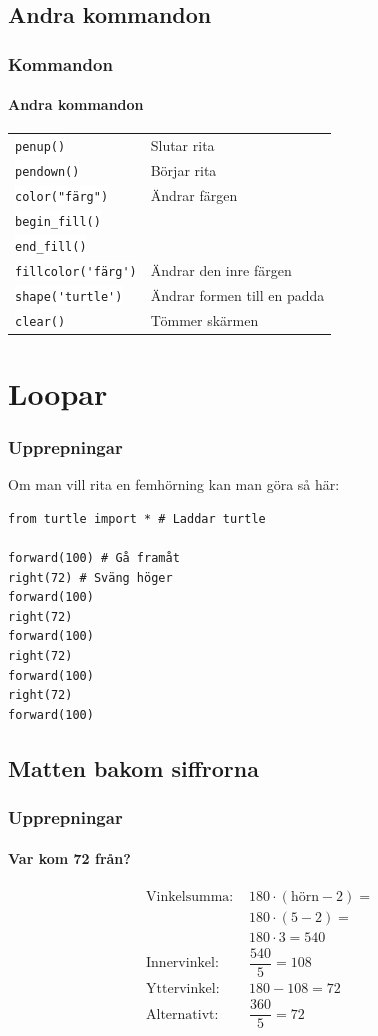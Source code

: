 \documentclass[aspectratio=169]{beamer}
\newcommand{\code}[1]{\colorbox{white}{\lstinline{#1}}}
\begin{document}
\subsection{Andra kommandon}

\begin{frame}
	\frametitle{Kommandon}
	\framesubtitle{Andra kommandon}
	
	\begin{tabular}{ll}
		\code{penup()} & Slutar rita\\
		\code{pendown()} & Börjar rita\\
		\code{color("färg")} & Ändrar färgen\\
		\code{begin_fill()} & \\
		\code{end_fill()} & \\
		\code{fillcolor('färg')} & Ändrar den inre färgen\\
		\code{shape('turtle')} & Ändrar formen till en padda\\
		\code{clear()} & Tömmer skärmen
	\end{tabular}
	
\end{frame}

\section{Loopar}

\begin{frame}[fragile]
	\frametitle{Upprepningar}
	
	Om man vill rita en femhörning kan man göra så här:
	
	\begin{lstlisting}
from turtle import * # Laddar turtle

forward(100) # Gå framåt
right(72) # Sväng höger
forward(100)
right(72)
forward(100)
right(72)
forward(100)
right(72)
forward(100)
	\end{lstlisting}
	
\end{frame}

\subsection{Matten bakom siffrorna}

\begin{frame}
	\frametitle{Upprepningar}
	\framesubtitle{Var kom 72 från?}

\begin{equation*}
	\begin{aligned}
		\text{Vinkelsumma: } & 180\cdot(\text{hörn}-2)=\\
		& 180\cdot(5-2)=\\
		& 180\cdot3=540\\
		\text{Innervinkel: } & \dfrac{540}{5}=108\\
		\text{Yttervinkel: } & 180-108=72\\
		\text{Alternativt: } & \dfrac{360}{5}=72
	\end{aligned}
\end{equation*}

\end{frame}
\end{document}
